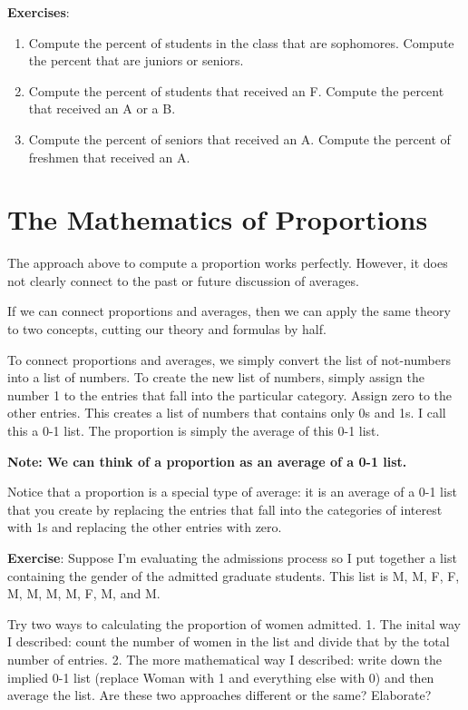 \documentclass[]{book}
\providecommand{\tightlist}{%
  \setlength{\itemsep}{0pt}\setlength{\parskip}{0pt}}
\theoremstyle{definition}
\theoremstyle{definition}
\theoremstyle{definition}
\theoremstyle{remark}
\begin{document}
\textbf{Exercises}:

\begin{enumerate}
\def\labelenumi{\arabic{enumi}.}
\tightlist
\item
  Compute the percent of students in the class that are sophomores.
  Compute the percent that are juniors or seniors.
\item
  Compute the percent of students that received an F. Compute the
  percent that received an A or a B.
\item
  Compute the percent of seniors that received an A. Compute the percent
  of freshmen that received an A.
\end{enumerate}

\section{The Mathematics of
Proportions}\label{the-mathematics-of-proportions}

The approach above to compute a proportion works perfectly. However, it
does not clearly connect to the past or future discussion of averages.

If we can connect proportions and averages, then we can apply the same
theory to two concepts, cutting our theory and formulas by half.

To connect proportions and averages, we simply convert the list of
not-numbers into a list of numbers. To create the new list of numbers,
simply assign the number 1 to the entries that fall into the particular
category. Assign zero to the other entries. This creates a list of
numbers that contains only 0s and 1s. I call this a 0-1 list. The
proportion is simply the average of this 0-1 list.

\textbf{Note: We can think of a proportion as an average of a 0-1 list.}

Notice that a proportion is a special type of average: it is an average
of a 0-1 list that you create by replacing the entries that fall into
the categories of interest with 1s and replacing the other entries with
zero.

\textbf{Exercise}: Suppose I'm evaluating the admissions process so I
put together a list containing the gender of the admitted graduate
students. This list is M, M, F, F, M, M, M, M, F, M, and M.

Try two ways to calculating the proportion of women admitted. 1. The
inital way I described: count the number of women in the list and divide
that by the total number of entries. 2. The more mathematical way I
described: write down the implied 0-1 list (replace Woman with 1 and
everything else with 0) and then average the list. Are these two
approaches different or the same? Elaborate?
\end{document}

